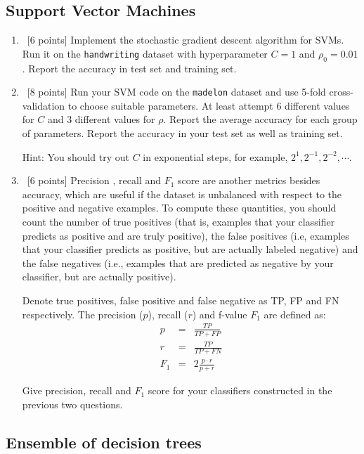 \subsection{Support Vector Machines}
\begin{enumerate}
\item ~[6 points] Implement the stochastic gradient descent algorithm
  for SVMs. Run it on the {\tt handwriting} dataset with
  hyperparameter $C=1$ and $\rho_0 = 0.01$. Report the accuracy in
  test set and training set.
\item ~[8 points] Run your SVM code on the {\tt madelon} dataset and
  use 5-fold cross-validation to choose suitable parameters. At least
  attempt 6 different values for $C$ and 3 different values for
  $\rho$. Report the average accuracy for each group of parameters.
  Report the accuracy in your test set as well as training set.

  Hint: You should try out $C$ in exponential steps, for example,
  $2^1, 2^{-1}, 2^{-2}, \cdots$.

\item ~[6 points] Precision , recall and $ F_1$ score are another
  metrics besides accuracy, which are useful if the dataset is
  unbalanced with respect to the positive and negative examples. To
  compute these quantities, you should count the number of true
  positives (that is, examples that your classifier predicts as
  positive and are truly positive), the false positives (i.e, examples
  that your classifier predicts as positive, but are actually labeled
  negative) and the false negatives (i.e., examples that are predicted
  as negative by your classifier, but are actually positive).
  
  Denote true positives, false positive and false negative as TP, FP
  and FN respectively. The precision ($p$), recall ($r$) and f-value
  $F_1$ are defined as:
  \begin{eqnarray*}
    p   & = & \frac{TP}{TP + FP} \\
    r   & = & \frac{TP}{TP+FN}   \\
    F_1 & = & 2 \frac{p \cdot r}{p + r} 
  \end{eqnarray*}

  Give precision, recall and $F_1$ score for your classifiers
  constructed in the previous two questions.
\end{enumerate}

\subsection{Ensemble of decision trees}

